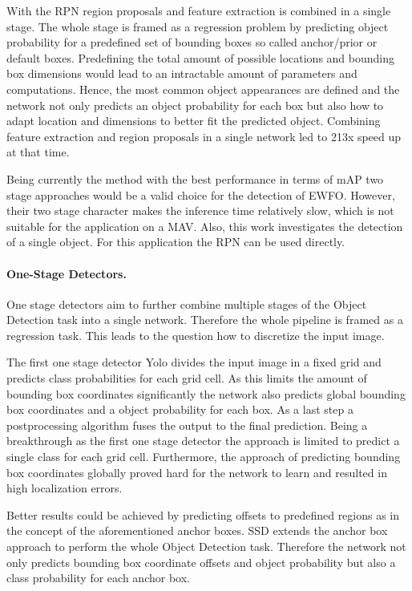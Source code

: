 With the \ac{RPN}\cite{Ren2015} region proposals and feature extraction is combined in a single stage. The whole stage is framed as a regression problem by predicting object probability for a predefined set of bounding boxes so called anchor/prior or default boxes.  Predefining the total amount of possible locations and bounding box dimensions would lead to an intractable amount of parameters and computations. Hence, the most common object appearances are defined and the network not only predicts an object probability for each box but also how to adapt location and dimensions to better fit the predicted object. Combining feature extraction and region proposals in a single network led to 213x speed up at that time.
 
Being currently the method with the best performance in terms of \ac{mAP} two stage approaches would be a valid choice for the detection of \ac{EWFO}. However, their two stage character makes the inference time relatively slow, which is not suitable for the application on a \ac{MAV}. Also, this work investigates the detection of a single object. For this application the \ac{RPN} can be used directly.

\paragraph{One-Stage Detectors.}

One stage detectors aim to further combine multiple stages of the Object Detection task into a single network. Therefore the whole pipeline is framed as a regression task. This leads to the question how to discretize the input image. 

The first one stage detector \ac{Yolo}\cite{Redmon} divides the input image in a fixed grid and predicts class probabilities for each grid cell. As this limits the amount of bounding box coordinates significantly the network also predicts global bounding box coordinates and a object probability for each box. As a last step a postprocessing algorithm fuses the output to the final prediction. Being a breakthrough as the first one stage detector the approach is limited to predict a single class for each grid cell. Furthermore, the approach of predicting bounding box coordinates globally proved hard for the network to learn and resulted in high localization errors.

Better results could be achieved by predicting offsets to predefined regions as in the concept of the aforementioned anchor boxes. \ac{SSD} \cite{Liu} extends the anchor box approach to perform the whole Object Detection task. Therefore the network not only predicts bounding box coordinate offsets and object probability but also a class probability for each anchor box. 


